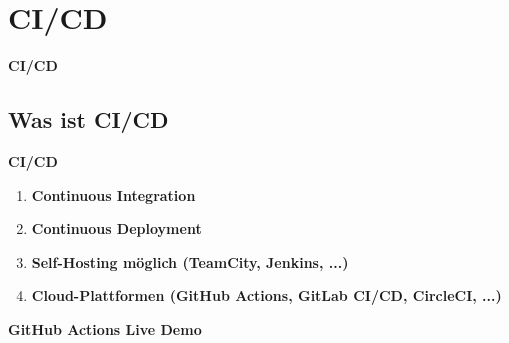\section{CI/CD}\label{sec:ci-cd}
\begin{frame}[c]
    \centering
    \Large
    \textbf{CI/CD}
\end{frame}

\subsection{Was ist CI/CD}\label{subsec:was-ist-ci-cd}
\begin{frame}[c]
    \slidehead
    \centering
    \large
    \textbf{CI/CD}
    \vspace{1em}
    \begin{enumerate}[<+->]
        \item \textbf{Continuous Integration}
        \item \textbf{Continuous Deployment}
        \item \textbf{Self-Hosting möglich (TeamCity, Jenkins, ...)}
        \item \textbf{Cloud-Plattformen (GitHub Actions, GitLab CI/CD, CircleCI, ...)}
    \end{enumerate}
\end{frame}

\begin{frame}[c]
    \slidehead
    \centering
    \Large
    \textbf{GitHub Actions Live Demo}
\end{frame}
